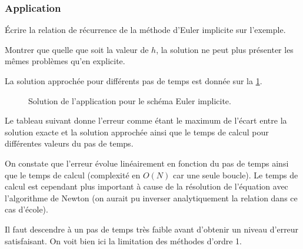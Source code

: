 \documentclass[10pt]{article}
\begin{document}
\subsubsection{Application}

  {\'Ecrire la relation de récurrence de la méthode d'Euler implicite sur l'exemple.}

  {Montrer que quelle que soit la valeur de $h$, la solution ne peut plus présenter les mêmes problèmes qu'en explicite.}

La solution approchée pour différents pas de temps est donnée sur la \ref{euler_impl}.

\begin{figure}[!ht]
\centering

\caption{Solution de l'application pour le schéma Euler implicite.}
\label{euler_impl}
\end{figure}

Le tableau suivant donne l'erreur comme étant le maximum de l'écart entre la solution exacte et la solution approchée ainsi que le temps de calcul pour différentes valeurs du pas de temps.

\begin{center}
\end{center}

On constate que l'erreur évolue linéairement en fonction du pas de temps ainsi que le temps de calcul (complexité en $O(N)$ car une seule boucle). Le temps de calcul est cependant plus important à cause de la résolution de l'équation avec l'algorithme de Newton (on aurait pu inverser analytiquement la relation dans ce cas d'école).

Il faut descendre à un pas de temps très faible avant d'obtenir un niveau d'erreur satisfaisant. On voit bien ici la limitation des méthodes d'ordre 1.
\end{document}
